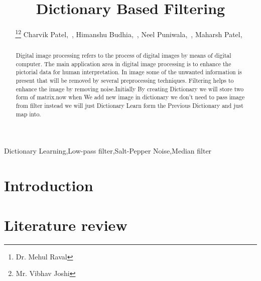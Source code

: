 \documentclass[journal]{IEEEtran}
\begin{document}
	\title{Dictionary Based Filtering}
	
	\author{\thanks{Dr. Mehul Raval}\thanks{Mr. Vibhav Joshi} Charvik Patel,~,
		Himanshu Budhia,~,
		Neel Puniwala,~, 
		Maharsh Patel,~}
	
	
	
	
	\maketitle
	
	
	\begin{abstract}
		Digital image processing refers to the process of digital
		images by means of digital computer. The main application
		area in digital image processing is to enhance the pictorial
		data for human interpretation. In image some of
		the unwanted information is present that will be removed by
		several preprocessing techniques. Filtering helps to enhance
		the image by removing noise.Initially By creating Dictionary we will store two form of matrix.now when We add new image in dictionary we don't need to pass image from filter instead we will just Dictionary Learn form the Previous Dictionary and just map into.
		
	\end{abstract}
	\begin{IEEEkeywords}
		Dictionary Learning,Low-pass filter,Salt-Pepper Noise,Median filter
	\end{IEEEkeywords}
	
	
	\IEEEpeerreviewmaketitle
	
	
	
	\section{\textbf{Introduction}}
		
	
	\section{\textbf{Literature review}}
\end{document}
